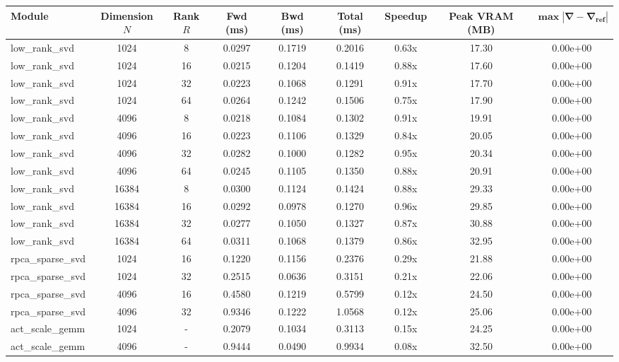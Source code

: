 \documentclass[journal]{IEEEtran}
\begin{document}
\begin{table}[t]
\centering
\small
\begin{tabular}{lcccccccc}
\toprule
\textbf{Module} & \textbf{Dimension $N$} & \textbf{Rank $R$} & \textbf{Fwd (ms)} & \textbf{Bwd (ms)} & \textbf{Total (ms)} & \textbf{Speedup} & \textbf{Peak VRAM (MB)} & $\mathbf{\max |\nabla - \nabla_{\text{ref}}|}$ \\
\midrule
low\_rank\_svd & 1024 & 8 & 0.0297 & 0.1719 & 0.2016 & 0.63x & 17.30 & 0.00e+00 \\
low\_rank\_svd & 1024 & 16 & 0.0215 & 0.1204 & 0.1419 & 0.88x & 17.60 & 0.00e+00 \\
low\_rank\_svd & 1024 & 32 & 0.0223 & 0.1068 & 0.1291 & 0.91x & 17.70 & 0.00e+00 \\
low\_rank\_svd & 1024 & 64 & 0.0264 & 0.1242 & 0.1506 & 0.75x & 17.90 & 0.00e+00 \\
low\_rank\_svd & 4096 & 8 & 0.0218 & 0.1084 & 0.1302 & 0.91x & 19.91 & 0.00e+00 \\
low\_rank\_svd & 4096 & 16 & 0.0223 & 0.1106 & 0.1329 & 0.84x & 20.05 & 0.00e+00 \\
low\_rank\_svd & 4096 & 32 & 0.0282 & 0.1000 & 0.1282 & 0.95x & 20.34 & 0.00e+00 \\
low\_rank\_svd & 4096 & 64 & 0.0245 & 0.1105 & 0.1350 & 0.88x & 20.91 & 0.00e+00 \\
low\_rank\_svd & 16384 & 8 & 0.0300 & 0.1124 & 0.1424 & 0.88x & 29.33 & 0.00e+00 \\
low\_rank\_svd & 16384 & 16 & 0.0292 & 0.0978 & 0.1270 & 0.96x & 29.85 & 0.00e+00 \\
low\_rank\_svd & 16384 & 32 & 0.0277 & 0.1050 & 0.1327 & 0.87x & 30.88 & 0.00e+00 \\
low\_rank\_svd & 16384 & 64 & 0.0311 & 0.1068 & 0.1379 & 0.86x & 32.95 & 0.00e+00 \\
rpca\_sparse\_svd & 1024 & 16 & 0.1220 & 0.1156 & 0.2376 & 0.29x & 21.88 & 0.00e+00 \\
rpca\_sparse\_svd & 1024 & 32 & 0.2515 & 0.0636 & 0.3151 & 0.21x & 22.06 & 0.00e+00 \\
rpca\_sparse\_svd & 4096 & 16 & 0.4580 & 0.1219 & 0.5799 & 0.12x & 24.50 & 0.00e+00 \\
rpca\_sparse\_svd & 4096 & 32 & 0.9346 & 0.1222 & 1.0568 & 0.12x & 25.06 & 0.00e+00 \\
act\_scale\_gemm & 1024 & - & 0.2079 & 0.1034 & 0.3113 & 0.15x & 24.25 & 0.00e+00 \\
act\_scale\_gemm & 4096 & - & 0.9444 & 0.0490 & 0.9934 & 0.08x & 32.50 & 0.00e+00 \\

\end{tabular}
\end{table}
\end{document}
